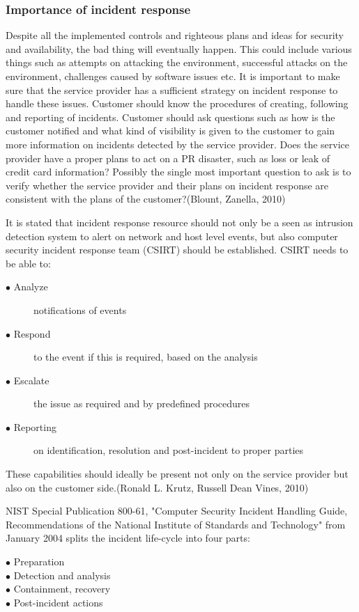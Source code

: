 \documentclass{article}
\begin{document}
\subsubsection{Importance of incident response}
Despite all the implemented controls and righteous plans and ideas for security and availability, the bad thing will eventually happen. This could include various things such as attempts on attacking the environment, successful attacks on the environment, challenges caused by software issues etc. It is important to make sure that the service provider has a sufficient strategy on incident response to handle these issues. Customer should know the procedures of creating, following and reporting of incidents. Customer should ask questions such as how is the customer notified and what kind of visibility is given to the customer to gain more information on incidents detected by the service provider. Does the service provider have a proper plans to act on a PR disaster, such as loss or leak of credit card information? Possibly the single most important question to ask is to verify whether the service provider and their plans on incident response are consistent with the plans of the customer?(Blount, Zanella, 2010)
\par
It is stated that incident response resource should not only be a seen as intrusion detection system to alert on network and host level events, but also computer security incident response team (CSIRT) should be established. CSIRT needs to be able to:
\begin{description}
	\item[$\bullet$ Analyze] notifications of events
	\item[$\bullet$ Respond] to the event if this is required, based on the analysis
	\item[$\bullet$ Escalate] the issue as required and by predefined procedures
	\item[$\bullet$ Reporting] on identification, resolution and post-incident to proper parties
\end{description}
These capabilities should ideally be present not only on the service provider but also on the customer side.(Ronald L. Krutz, Russell Dean Vines, 2010)
\par
NIST Special Publication 800-61, "Computer Security Incident Handling Guide, Recommendations of the National Institute of Standards and Technology" from January 2004 splits the incident life-cycle into four parts:
\begin{description}
	\item[$\bullet$ Preparation]
	\item[$\bullet$ Detection and analysis]
	\item[$\bullet$ Containment, recovery]
	\item[$\bullet$ Post-incident actions]
\end{description}
\end{document}

